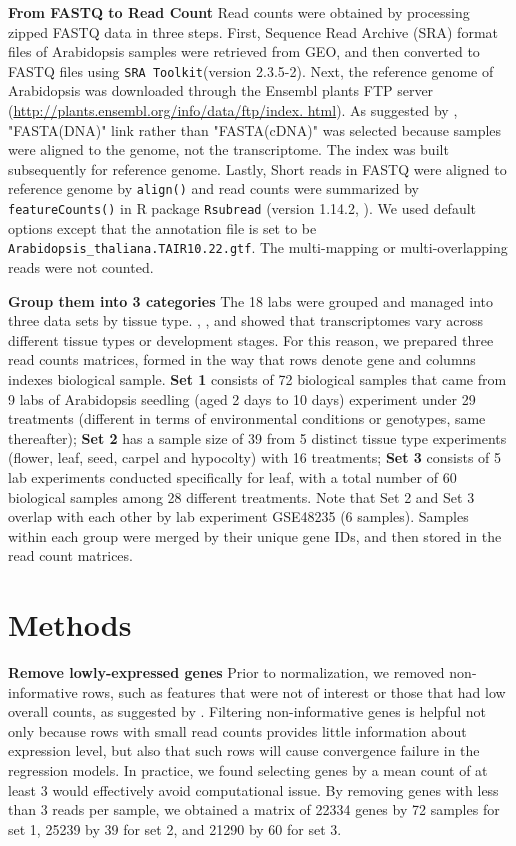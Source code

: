 \documentclass[11pt, a4paper]{article}
\begin{document}
\textbf{From FASTQ to Read Count} Read counts were obtained by processing zipped FASTQ data in three steps. First, Sequence Read Archive (SRA) format files of Arabidopsis samples were retrieved from GEO, and then converted to FASTQ files using \verb"SRA Toolkit"(version 2.3.5-2). Next, the reference genome of Arabidopsis was downloaded  through the Ensembl plants FTP server (\url{http://plants.ensembl.org/info/data/ftp/index. html}). As suggested by \cite{anders2013count},  "FASTA(DNA)" link rather than "FASTA(cDNA)" was selected because samples were aligned to the genome, not the transcriptome. The index  was built subsequently for reference genome.  Lastly, Short reads in FASTQ were  aligned to reference genome by  \verb"align()" and read counts were summarized by \verb"featureCounts()" in R package \verb"Rsubread" (version 1.14.2,  \cite{liao2013subread}). We used default options except that the annotation file is set to be \verb"Arabidopsis_thaliana.TAIR10.22.gtf".  The multi-mapping or multi-overlapping reads were not counted.  


  
\textbf{Group them into 3 categories} The 18 labs were grouped and managed into three data sets by tissue type.  \cite{czechowski2005genome}, \cite{hruz2011refgenes}, and \cite{dekkers2012identification} showed that transcriptomes vary across different tissue types or development stages. For this reason, we prepared three read counts matrices, formed in the way that rows denote gene and columns indexes biological sample. \textbf{Set 1} consists of 72 biological samples that came from 9 labs of Arabidopsis seedling (aged 2 days to 10 days) experiment under 29 treatments (different in terms of environmental conditions or genotypes, same thereafter); \textbf{Set 2} has a sample size of 39 from 5 distinct tissue type experiments (flower, leaf, seed, carpel and hypocolty) with 16 treatments; \textbf{Set 3} consists of 5 lab experiments conducted specifically for leaf, with a total number of 60 biological samples among 28 different treatments. Note that  Set 2 and Set 3 overlap with each other by lab experiment GSE48235 (6 samples). Samples within each group were merged by their unique gene IDs, and then stored in the read count matrices.
  \\




\section{Methods}
\textbf{Remove lowly-expressed genes} Prior to normalization, we removed non-informative rows, such as features that were not of interest or those that had low overall counts, as suggested by \cite{anders2013count}. Filtering non-informative genes is helpful not only because rows with small read counts provides little information about expression level,  but also that such rows will cause convergence failure in the regression models. In practice,  we found selecting genes by a mean count of at least 3 would effectively avoid computational issue.  By removing genes with less than 3 reads per sample, we obtained a matrix of 22334 genes by 72 samples for set 1, 25239 by 39 for set 2, and 21290 by 60  for set 3.  
\end{document}
